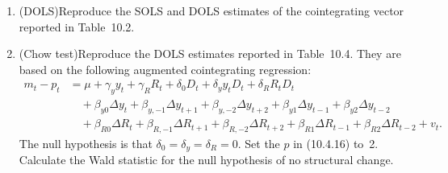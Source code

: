 \begin{problemset}
\begin{enumerate}[label=(\alph*)]
\item (DOLS)\quad Reproduce the SOLS and DOLS estimates of the cointegrating vector
  reported in Table~10.2.

\item (Chow test)\quad Reproduce the DOLS estimates reported in Table~10.4. They are
  based on the following augmented cointegrating regression:
  \begin{align*}
    m_t - p_t
    &= \mu + \gamma_y y_t + \gamma_R R_t
      + \delta_0 D_t + \delta_y y_t D_t + \delta_R R_t D_t \\
    &\quad + \beta_{y0} \Delta y_t
      + \beta_{y,-1} \Delta y_{t+1} + \beta_{y,-2} \Delta y_{t+2}
      + \beta_{y1} \Delta y_{t-1} + \beta_{y2} \Delta y_{t-2} \\
    &\quad + \beta_{R0} \Delta R_t
      + \beta_{R,-1} \Delta R_{t+1} + \beta_{R,-2} \Delta R_{t+2}
      + \beta_{R1} \Delta R_{t-1} + \beta_{R2} \Delta R_{t-2}
      + v_t.
  \end{align*}
  The null hypothesis is that $\delta_0 = \delta_y = \delta_R = 0$. Set the $p$ in (10.4.16) to~2.
  Calculate the Wald statistic for the null hypothesis of no structural change.
\end{enumerate}

\end{problemset}
